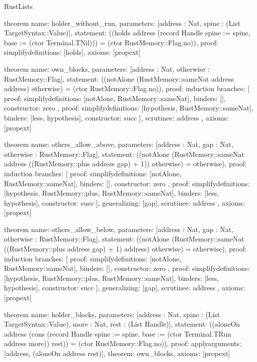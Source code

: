 \begin{lexlean}{RustLists}
\begin{semanticmodule}
theorem{
  name: holder_without_run,
  parameters: [address : Nat, spine : (List TargetSyntax::Value)],
  statement: ((holds address (record Handle {spine := spine, base := (ctor Terminal.TNil)})) = (ctor RustMemory::Flag.no)),
  proof: simplify{definitions: [holds]},
  axioms: [propext]
}

theorem{
  name: own_blocks,
  parameters: [address : Nat, otherwise : RustMemory::Flag],
  statement: ((notAlone (RustMemory::sameNat address address) otherwise) = (ctor RustMemory::Flag.no)),
  proof: induction{
    branches: [
      {
        proof: simplify{definitions: [notAlone, RustMemory::sameNat]},
        binders: [],
        constructor: zero
      },
      {
        proof: simplify{definitions: [hypothesis, RustMemory::sameNat]},
        binders: [less, hypothesis],
        constructor: succ
      }
    ],
    scrutinee: address
  },
  axioms: [propext]
}

theorem{
  name: others_allow_above,
  parameters: [address : Nat, gap : Nat, otherwise : RustMemory::Flag],
  statement: ((notAlone (RustMemory::sameNat address ((RustMemory::plus address gap) + 1)) otherwise) = otherwise),
  proof: induction{
    branches: [
      {
        proof: simplify{definitions: [notAlone, RustMemory::sameNat]},
        binders: [],
        constructor: zero
      },
      {
        proof: simplify{definitions: [hypothesis, RustMemory::plus, RustMemory::sameNat]},
        binders: [less, hypothesis],
        constructor: succ
      }
    ],
    generalizing: [gap],
    scrutinee: address
  },
  axioms: [propext]
}

theorem{
  name: others_allow_below,
  parameters: [address : Nat, gap : Nat, otherwise : RustMemory::Flag],
  statement: ((notAlone (RustMemory::sameNat ((RustMemory::plus address gap) + 1) address) otherwise) = otherwise),
  proof: induction{
    branches: [
      {
        proof: simplify{definitions: [notAlone, RustMemory::sameNat]},
        binders: [],
        constructor: zero
      },
      {
        proof: simplify{definitions: [hypothesis, RustMemory::plus, RustMemory::sameNat]},
        binders: [less, hypothesis],
        constructor: succ
      }
    ],
    generalizing: [gap],
    scrutinee: address
  },
  axioms: [propext]
}

theorem{
  name: holder_blocks,
  parameters: [address : Nat, spine : (List TargetSyntax::Value), more : Nat, rest : (List Handle)],
  statement: ((aloneOn address (cons (record Handle {spine := spine, base := (ctor Terminal.TRun address more)}) rest)) = (ctor RustMemory::Flag.no)),
  proof: apply{arguments: [address, (aloneOn address rest)], theorem: own_blocks},
  axioms: [propext]
}


\end{semanticmodule}
\end{lexlean}
